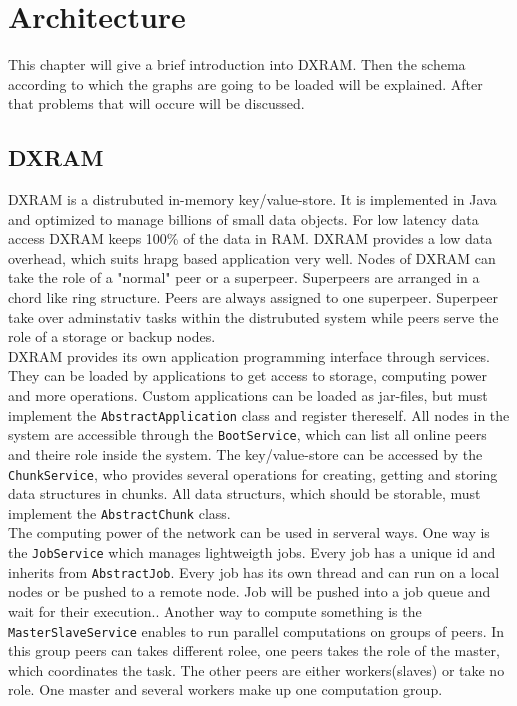 \chapter{Architecture}
\label{Architecture}
This chapter will give a brief introduction into DXRAM. Then the schema according to which the graphs are going to be loaded will be explained. After that problems that will occure will be discussed. 
\section{DXRAM}
DXRAM is a distrubuted in-memory key/value-store. 
It is implemented in Java and optimized to manage billions of small data objects. 
For low latency data access DXRAM keeps 100\% of the data in RAM. 
DXRAM provides a low data overhead, which suits hrapg based application very well.
Nodes of DXRAM can take the role of a "normal" peer or a superpeer. Superpeers are arranged in a chord like ring structure. Peers are always assigned to one superpeer. Superpeer take over adminstativ tasks within the distrubuted system while peers serve the role of a storage or backup nodes.\\
DXRAM provides its own application programming interface through services. They can be loaded by applications to get access to storage, computing power and more operations. Custom applications can be loaded as jar-files, but must implement the \texttt{AbstractApplication} class and register thereself. All nodes in the system are accessible through the \texttt{BootService}, which can list all online peers and theire role inside the system.
The key/value-store can be accessed by the \texttt{ChunkService}, who provides several operations for creating, getting and storing data structures in chunks. All data structurs, which should be storable, must implement the \texttt{AbstractChunk} class.\\
The computing power of the network can be used in serveral ways. One way is the \texttt{JobService} which manages lightweigth jobs. Every job has a unique id and inherits from \texttt{AbstractJob}. Every job has its own thread and can run on a local nodes or be pushed to a remote node. Job will be pushed into a job queue and wait for their execution.. Another way to compute something is the \texttt{MasterSlaveService} enables to run parallel computations on groups of peers. In this group peers can takes different rolee, one peers takes the role of the master, which coordinates the task. The other peers are either workers(slaves) or take no role. One master and several workers make up one computation group.\cite{Beineke.20180714,dxramoverview}

